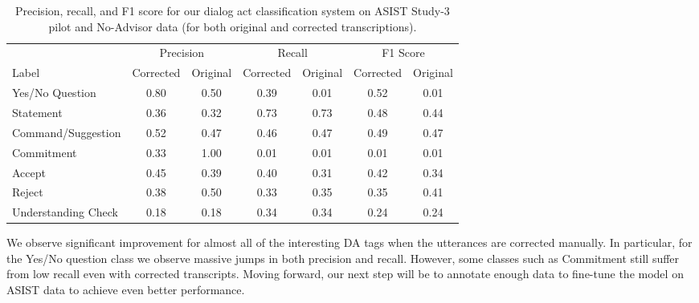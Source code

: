 \begin{table}
    \centering
    \begin{tabular}{l cc cc cc}
        \toprule
                            & \multicolumn{2}{c}{Precision} & \multicolumn{2}{c}{Recall} & \multicolumn{2}{c}{F1 Score}\\
                                \cmidrule(lr){2-3} \cmidrule(lr){4-5} \cmidrule(lr){6-7}
       Label                & Corrected & Original & Corrected & Original & Corrected & Original\\
                             \midrule
        Yes/No Question      & 0.80     & 0.50      & 0.39     & 0.01      & 0.52     & 0.01\\
        Statement            & 0.36     & 0.32      & 0.73     & 0.73      & 0.48     & 0.44\\
        Command/Suggestion   & 0.52     & 0.47      & 0.46     & 0.47      & 0.49     & 0.47\\
        Commitment           & 0.33     & 1.00      & 0.01     & 0.01      & 0.01     & 0.01\\
        Accept               & 0.45     & 0.39      & 0.40     & 0.31      & 0.42     & 0.34\\
        Reject               & 0.38     & 0.50      & 0.33     & 0.35      & 0.35     & 0.41\\
        Understanding Check  & 0.18     & 0.18      & 0.34     & 0.34      & 0.24     & 0.24\\
        \bottomrule
    \end{tabular}
    \caption{%
        Precision, recall, and F1 score for our dialog act classification
        system on ASIST Study-3 pilot and No-Advisor data (for both original and
        corrected transcriptions).
    }
    \label{tab:da_results}
\end{table}

We observe significant improvement for almost all of the interesting DA tags
when the utterances are corrected manually. In particular, for the Yes/No
question class we observe massive jumps in both precision and recall. However,
some classes such as Commitment still suffer from low recall even with
corrected transcripts. Moving forward, our next step will be to annotate enough
data to fine-tune the model on ASIST data to achieve even better performance.

